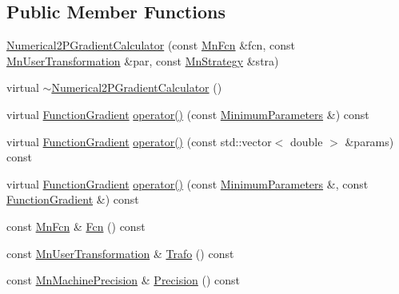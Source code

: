 \subsection*{Public Member Functions}
\begin{DoxyCompactItemize}
\item 
\mbox{\hyperlink{classROOT_1_1Minuit2_1_1Numerical2PGradientCalculator_ab9e5f93630233d189cb8856753a2cff8}{Numerical2\+P\+Gradient\+Calculator}} (const \mbox{\hyperlink{classROOT_1_1Minuit2_1_1MnFcn}{Mn\+Fcn}} \&fcn, const \mbox{\hyperlink{classROOT_1_1Minuit2_1_1MnUserTransformation}{Mn\+User\+Transformation}} \&par, const \mbox{\hyperlink{classROOT_1_1Minuit2_1_1MnStrategy}{Mn\+Strategy}} \&stra)
\item 
virtual \mbox{\hyperlink{classROOT_1_1Minuit2_1_1Numerical2PGradientCalculator_a9e82d6d064c232e74fc49e2262ebb597}{$\sim$\+Numerical2\+P\+Gradient\+Calculator}} ()
\item 
virtual \mbox{\hyperlink{classROOT_1_1Minuit2_1_1FunctionGradient}{Function\+Gradient}} \mbox{\hyperlink{classROOT_1_1Minuit2_1_1Numerical2PGradientCalculator_a40aca4ad0b9583062fc830c359140b43}{operator()}} (const \mbox{\hyperlink{classROOT_1_1Minuit2_1_1MinimumParameters}{Minimum\+Parameters}} \&) const
\item 
virtual \mbox{\hyperlink{classROOT_1_1Minuit2_1_1FunctionGradient}{Function\+Gradient}} \mbox{\hyperlink{classROOT_1_1Minuit2_1_1Numerical2PGradientCalculator_ae0501810e548a264aa74855d586b0d13}{operator()}} (const std\+::vector$<$ double $>$ \&params) const
\item 
virtual \mbox{\hyperlink{classROOT_1_1Minuit2_1_1FunctionGradient}{Function\+Gradient}} \mbox{\hyperlink{classROOT_1_1Minuit2_1_1Numerical2PGradientCalculator_a89c825ba34455277290940fa62fc5321}{operator()}} (const \mbox{\hyperlink{classROOT_1_1Minuit2_1_1MinimumParameters}{Minimum\+Parameters}} \&, const \mbox{\hyperlink{classROOT_1_1Minuit2_1_1FunctionGradient}{Function\+Gradient}} \&) const
\item 
const \mbox{\hyperlink{classROOT_1_1Minuit2_1_1MnFcn}{Mn\+Fcn}} \& \mbox{\hyperlink{classROOT_1_1Minuit2_1_1Numerical2PGradientCalculator_a84287ad0b3e0b38769c3ecb00cac1c22}{Fcn}} () const
\item 
const \mbox{\hyperlink{classROOT_1_1Minuit2_1_1MnUserTransformation}{Mn\+User\+Transformation}} \& \mbox{\hyperlink{classROOT_1_1Minuit2_1_1Numerical2PGradientCalculator_a5a0bce9f2c00da4aae9a2b6d3b706010}{Trafo}} () const
\item 
const \mbox{\hyperlink{classROOT_1_1Minuit2_1_1MnMachinePrecision}{Mn\+Machine\+Precision}} \& \mbox{\hyperlink{classROOT_1_1Minuit2_1_1Numerical2PGradientCalculator_a661d6dcac5eeb09c36d9b64829f0448c}{Precision}} () const

\end{DoxyCompactItemize}
